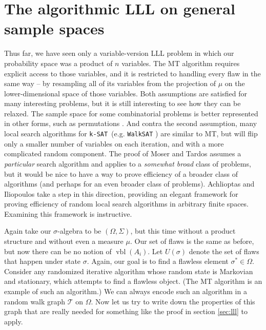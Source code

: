 \documentclass[twocolumn]{article}
\newcommand{\ksat}{\texttt{k-SAT}~}
\begin{document}
\section{The algorithmic LLL on general sample spaces}
\label{sec:perfect}
Thus far, we have seen only a variable-version LLL problem in which our probability space was a product of $n$ variables.  The MT algorithm requires explicit access to those variables, and it is restricted to handling every flaw in the same way -- by resampling all of its variables from the projection of $\mu$ on the lower-dimensional space of those variables.  Both assumptions are satisfied for many interesting problems, but it is still interesting to see how they can be relaxed.  The sample space for some combinatorial problems is better represented in other forms, such as permutations \cite{achlioptas2014random}.  And contra the second assumption, many local search algorithms for \ksat (e.g. \texttt{WalkSAT} \cite{papadimitriou1991selecting}) are similar to MT, but will flip only a smaller number of variables on each iteration, and with a more complicated random component.  The proof of Moser and Tardos assumes a \emph{particular} search algorithm and applies to a \emph{somewhat broad} class of problems, but it would be nice to have a way to prove efficiency of a broader class of algorithms (and perhaps for an even broader class of problems).  Achlioptas and Iliopoulos \cite{achlioptas2014random} take a step in this direction, providing an elegant framework for proving efficiency of random local search algorithms in arbitrary finite spaces.  Examining this framework is instructive.

Again take our $\sigma$-algebra to be $(\Omega, \Sigma)$, but this time without a product structure and without even a measure $\mu$.  Our set of flaws is the same as before, but now there can be no notion of $\operatorname{vbl}(A_i)$.  Let $U(\sigma)$ denote the set of flaws that happen under state $\sigma$.  Again, our goal is to find a flawless element $\sigma^* \in \Omega$.  Consider any randomized iterative algorithm whose random state is Markovian and stationary, which attempts to find a flawless object.  (The MT algorithm is an example of such an algorithm.)  We can always encode such an algorithm in a random walk graph $\mathcal{T}$ on $\Omega$.  Now let us try to write down the properties of this graph that are really needed for something like the proof in section \ref{sec:lll} to apply.
\end{document}

